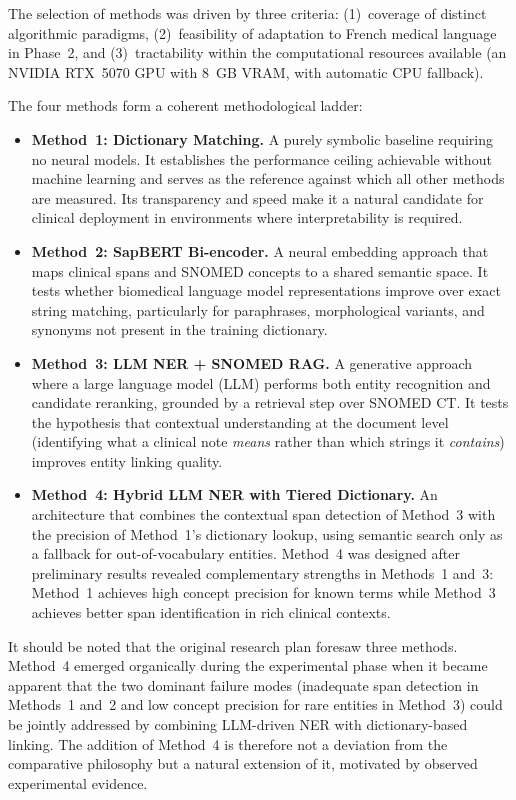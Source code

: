 The selection of methods was driven by three criteria: (1)~coverage of distinct algorithmic paradigms, (2)~feasibility of adaptation to French medical language in Phase~2, and (3)~tractability within the computational resources available (an NVIDIA RTX~5070 GPU with 8~GB VRAM, with automatic CPU fallback).

The four methods form a coherent methodological ladder:

\begin{itemize}
    \item \textbf{Method~1: Dictionary Matching.}
    A purely symbolic baseline requiring no neural models. It establishes the performance ceiling achievable without machine learning and serves as the reference against which all other methods are measured. Its transparency and speed make it a natural candidate for clinical deployment in environments where interpretability is required.

    \item \textbf{Method~2: SapBERT Bi-encoder.}
    A neural embedding approach that maps clinical spans and SNOMED concepts to a shared semantic space. It tests whether biomedical language model representations improve over exact string matching, particularly for paraphrases, morphological variants, and synonyms not present in the training dictionary.

    \item \textbf{Method~3: LLM NER + SNOMED RAG.}
    A generative approach where a large language model (LLM) performs both entity recognition and candidate reranking, grounded by a retrieval step over SNOMED CT. It tests the hypothesis that contextual understanding at the document level (identifying what a clinical note \textit{means} rather than which strings it \textit{contains}) improves entity linking quality.

    \item \textbf{Method~4: Hybrid LLM NER with Tiered Dictionary.}
    An architecture that combines the contextual span detection of Method~3 with the precision of Method~1's dictionary lookup, using semantic search only as a fallback for out-of-vocabulary entities. Method~4 was designed after preliminary results revealed complementary strengths in Methods~1 and~3: Method~1 achieves high concept precision for known terms while Method~3 achieves better span identification in rich clinical contexts.
\end{itemize}

It should be noted that the original research plan foresaw three methods. Method~4 emerged organically during the experimental phase when it became apparent that the two dominant failure modes (inadequate span detection in Methods~1 and~2 and low concept precision for rare entities in Method~3) could be jointly addressed by combining LLM-driven NER with dictionary-based linking. The addition of Method~4 is therefore not a deviation from the comparative philosophy but a natural extension of it, motivated by observed experimental evidence.

